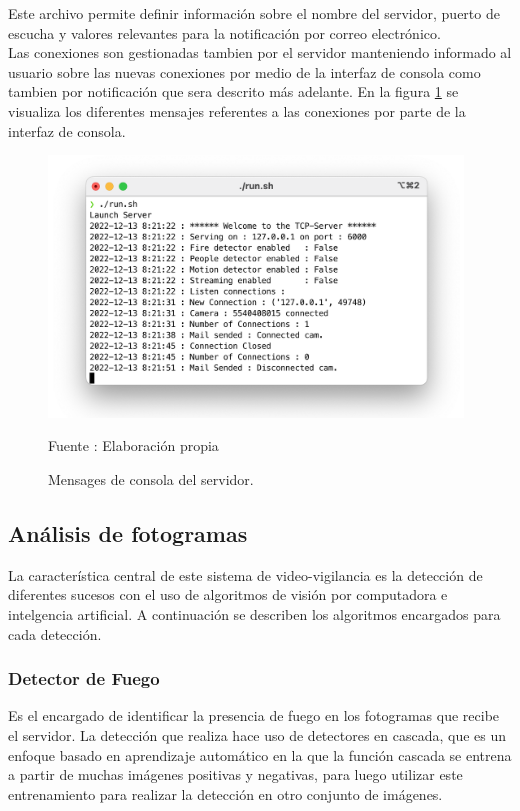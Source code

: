 Este archivo permite definir información sobre el nombre del servidor, puerto de escucha y valores relevantes para la notificación por correo electrónico.\\

Las conexiones son gestionadas tambien por el servidor manteniendo informado al usuario sobre las nuevas conexiones por medio de la interfaz de consola como tambien por notificación que sera descrito más adelante. En la figura \ref{fig:server_messages} se visualiza los diferentes mensajes referentes a las conexiones por parte de la interfaz de consola.

\begin{figure}[H]
    \begin{center}
        \includegraphics[width=11cm]{img/capitulo_5/server_messages.png}
    \end{center}
    \begin{center}
        \caption{Mensages de consola del servidor.}
        Fuente : Elaboración propia
        \label{fig:server_messages}
    \end{center}
\end{figure}

\subsection{Análisis de fotogramas}
La característica central de este sistema de video-vigilancia es la detección de diferentes sucesos con el uso de algoritmos de visión por computadora e intelgencia artificial. A continuación se describen los algoritmos encargados para cada detección.
\subsubsection{Detector de Fuego}
Es el encargado de identificar la presencia de fuego en los fotogramas que recibe el servidor. La detección que realiza hace uso de detectores en cascada, que es un enfoque basado en aprendizaje automático en la que la función cascada se entrena a partir de muchas imágenes positivas y negativas, para luego utilizar este entrenamiento para realizar la detección en otro conjunto de imágenes.\\

